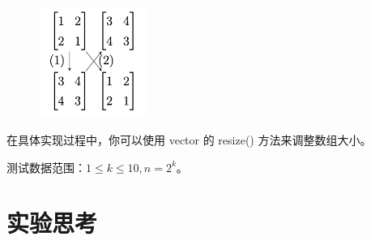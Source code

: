 \documentclass[12pt,a4paper]{article}
\begin{document}
\begin{figure}[h]
    \centering
    \includegraphics[width=3.5cm]{img/lab2/tips2.png}
\end{figure}

在具体实现过程中，你可以使用 vector 的 resize() 方法来调整数组大小。

测试数据范围：$1 \le k \le 10, n = 2^k$。


\section{实验思考}
\end{document}
